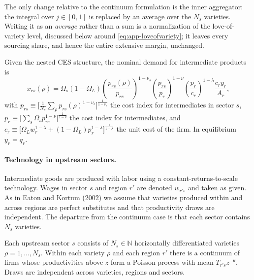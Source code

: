 The only change relative to the continuum formulation is the inner aggregator: the integral over
$j\in[0,1]$ is replaced by an average over the $N_{s}$ varieties. Writing it as an
\emph{average} rather than a sum is a normalization of the love-of-variety level, discussed
below around \eqref{eq:app-loveofvariety}; it leaves every sourcing share, and hence the entire
extensive margin, unchanged.

Given the nested CES structure, the nominal demand for intermediate products is
\begin{equation}
x_{rs}(\rho)=\Omega_{s}(1-\Omega_{L})
\left(\frac{p_{rs}(\rho)}{p_{rs}}\right)^{1-\nu_{s}}
\left(\frac{p_{rs}}{p_{r}}\right)^{1-\nu}
\left(\frac{p_{r}}{c_{r}}\right)^{1-\lambda}\frac{c_{r}y_{r}}{A_{r}},
\end{equation}
with $p_{rs}\equiv\big[\tfrac{1}{N_{s}}\sum_{\rho}p_{rs}(\rho)^{1-\nu_{s}}\big]^{\frac{1}{1-\nu_{s}}}$
the cost index for intermediates in sector $s$,
$p_{r}\equiv\big[\sum_{s}\Omega_{s}p_{rs}^{1-\nu}\big]^{\frac{1}{1-\nu}}$ the cost index for
intermediates, and
$c_{r}\equiv\big[\Omega_{L}w_{r}^{1-\lambda}+(1-\Omega_{L})p_{r}^{1-\lambda}\big]^{\frac{1}{1-\lambda}}$
the unit cost of the firm. In equilibrium $y_{r}=q_{r}$.

\paragraph{Technology in upstream sectors.} Intermediate goods are produced with labor using a
constant-returns-to-scale technology. Wages in sector $s$ and region $r'$ are denoted $w_{r's}$
and taken as given. As in Eaton and Kortum (2002) we assume that varieties produced within and
across regions are perfect substitutes and that productivity draws are independent. The
departure from the continuum case is that each sector contains $N_{s}$ varieties.

\begin{assumption}[Granularity]
\label{as:granular}
Each upstream sector $s$ consists of $N_{s}\in\mathbb{N}$ horizontally differentiated varieties
$\rho=1,\dots,N_{s}$. Within each variety $\rho$ and each region $r'$ there is a continuum of
firms whose productivities above $z$ form a Poisson process with mean $T_{r's}z^{-\theta}$.
Draws are independent across varieties, regions and sectors.
\end{assumption}

